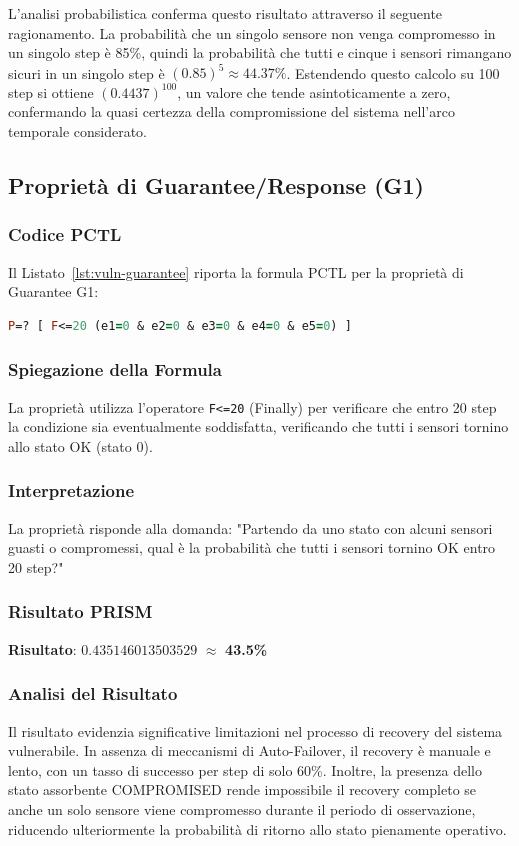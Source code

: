 L'analisi probabilistica conferma questo risultato attraverso il seguente ragionamento. La probabilità che un singolo sensore non venga compromesso in un singolo step è 85\%, quindi la probabilità che tutti e cinque i sensori rimangano sicuri in un singolo step è $(0.85)^5 \approx 44.37\%$. Estendendo questo calcolo su 100 step si ottiene $(0.4437)^{100}$, un valore che tende asintoticamente a zero, confermando la quasi certezza della compromissione del sistema nell'arco temporale considerato.

\subsection{Proprietà di Guarantee/Response (G1)}

\subsubsection{Codice PCTL}
Il Listato~\ref{lst:vuln-guarantee} riporta la formula PCTL per la proprietà di Guarantee G1:
\begin{lstlisting}[style=mystyle, language=Prolog, caption={Proprietà Guarantee G1 (vulnerabile)}, label=lst:vuln-guarantee]
P=? [ F<=20 (e1=0 & e2=0 & e3=0 & e4=0 & e5=0) ]
\end{lstlisting}

\subsubsection{Spiegazione della Formula}
La proprietà utilizza l'operatore \texttt{F<=20} (Finally) per verificare che entro 20 step la condizione sia eventualmente soddisfatta, verificando che tutti i sensori tornino allo stato OK (stato 0).

\subsubsection{Interpretazione}
La proprietà risponde alla domanda: "Partendo da uno stato con alcuni sensori guasti o compromessi, qual è la probabilità che tutti i sensori tornino OK entro 20 step?"

\subsubsection{Risultato PRISM}
\textbf{Risultato}: $0.435146013503529$ $\approx$ \textbf{43.5\%}

\subsubsection{Analisi del Risultato}
Il risultato evidenzia significative limitazioni nel processo di recovery del sistema vulnerabile. In assenza di meccanismi di Auto-Failover, il recovery è manuale e lento, con un tasso di successo per step di solo 60\%. Inoltre, la presenza dello stato assorbente COMPROMISED rende impossibile il recovery completo se anche un solo sensore viene compromesso durante il periodo di osservazione, riducendo ulteriormente la probabilità di ritorno allo stato pienamente operativo.

